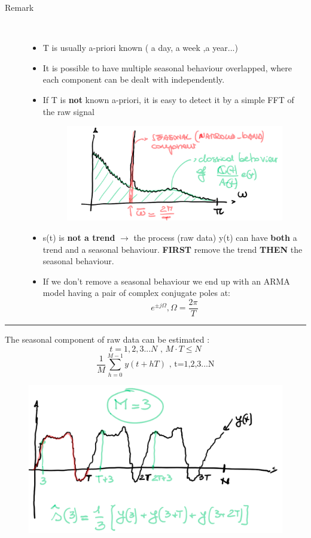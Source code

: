 \documentclass[12pt]{article} %
\begin{document}
\begin{description}
\item [Remark]\hfill\\
\begin{itemize}
\item T is usually a-priori known ( a day, a week ,a year...)
\item It is possible to have multiple seasonal behaviour overlapped, where each component can be dealt with independently.
\item If T is \textbf{not} known a-priori, it is easy to detect it by a simple FFT of the raw signal
\begin{figure}[H]
 \centering
  \includegraphics[width=.7\linewidth]{seasonal_fft}
\end{figure}
\item s(t) is \textbf{not a trend} $\to$  the process (raw data) y(t) can have \textbf{both} a trend and a seasonal behaviour. \textbf{FIRST} remove the trend \textbf{THEN} the seasonal behaviour.
\item If we don't remove a seasonal behaviour we end up with an ARMA model having a pair of complex conjugate poles at:
$$ e^{\pm j\Omega} , \Omega =\frac{2\pi}{T}$$  
\end{itemize}
\end{description}
\par\noindent\rule{\textwidth}{0.4pt}
The seasonal component of raw data can be estimated :
$$ t=1,2,3...N \text{  ,  } M\cdot T \leq N$$
\[
\boxed{\frac{1}{M}\sum\limits_{h=0}^{M-1}y(t+hT) \text{  , t=1,2,3...N}}
\]
\begin{figure}[H]
 \centering
  \includegraphics[width=.6\linewidth]{seasonal_est}
\end{figure}
\end{document}
